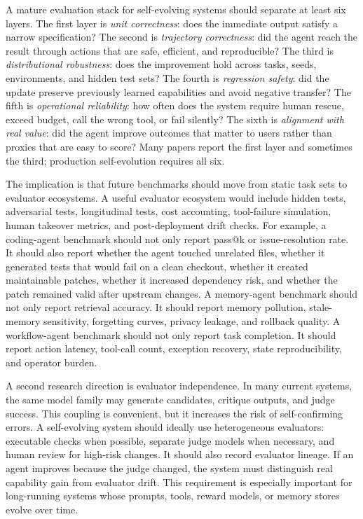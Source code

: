 A mature evaluation stack for self-evolving systems should separate at least six layers. The first layer is \emph{unit correctness}: does the immediate output satisfy a narrow specification? The second is \emph{trajectory correctness}: did the agent reach the result through actions that are safe, efficient, and reproducible? The third is \emph{distributional robustness}: does the improvement hold across tasks, seeds, environments, and hidden test sets? The fourth is \emph{regression safety}: did the update preserve previously learned capabilities and avoid negative transfer? The fifth is \emph{operational reliability}: how often does the system require human rescue, exceed budget, call the wrong tool, or fail silently? The sixth is \emph{alignment with real value}: did the agent improve outcomes that matter to users rather than proxies that are easy to score? Many papers report the first layer and sometimes the third; production self-evolution requires all six.

The implication is that future benchmarks should move from static task sets to evaluator ecosystems. A useful evaluator ecosystem would include hidden tests, adversarial tests, longitudinal tests, cost accounting, tool-failure simulation, human takeover metrics, and post-deployment drift checks. For example, a coding-agent benchmark should not only report pass@k or issue-resolution rate. It should also report whether the agent touched unrelated files, whether it generated tests that would fail on a clean checkout, whether it created maintainable patches, whether it increased dependency risk, and whether the patch remained valid after upstream changes. A memory-agent benchmark should not only report retrieval accuracy. It should report memory pollution, stale-memory sensitivity, forgetting curves, privacy leakage, and rollback quality. A workflow-agent benchmark should not only report task completion. It should report action latency, tool-call count, exception recovery, state reproducibility, and operator burden.

A second research direction is evaluator independence. In many current systems, the same model family may generate candidates, critique outputs, and judge success. This coupling is convenient, but it increases the risk of self-confirming errors. A self-evolving system should ideally use heterogeneous evaluators: executable checks when possible, separate judge models when necessary, and human review for high-risk changes. It should also record evaluator lineage. If an agent improves because the judge changed, the system must distinguish real capability gain from evaluator drift. This requirement is especially important for long-running systems whose prompts, tools, reward models, or memory stores evolve over time.

